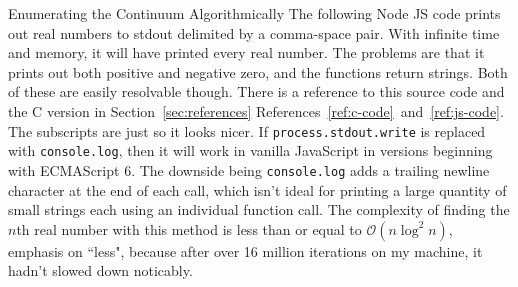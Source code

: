 \documentclass[12pt]{article}
\begin{document}
\begin{section}{Enumerating the Continuum Algorithmically}\label{sec:algorithm code}
	The following Node JS code prints out real numbers to stdout delimited by a comma-space
	pair. With infinite time and memory, it will have printed every real number. The problems
	are that it prints out both positive and negative zero, and the functions return strings.
	Both of these are easily resolvable though. There is a reference to this source code and
	the C version in Section~\ref{sec:references} References~\ref{ref:c-code}~and~\ref{ref:js-code}.
	The subscripts are just so it looks nicer. If \texttt{process.stdout.write} is replaced with
	\texttt{console.log}, then it will work in vanilla JavaScript in versions beginning with
	ECMAScript 6. The downside being \texttt{console.log} adds a trailing newline character at
	the end of each call, which isn't ideal for printing a large quantity of small strings each
	using an individual function call. The complexity of finding the $n$th real number with this
	method is less than or equal to $\mathcal O\!\left(n\log^2n\right)$, emphasis on ``less",
	because after over 16 million iterations on my machine, it hadn't slowed down noticably.


\end{section}
\end{document}
